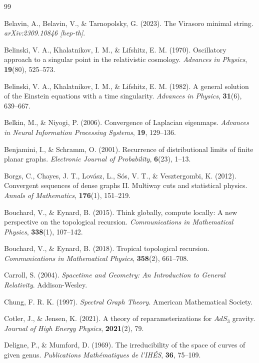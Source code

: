 \documentclass[12pt]{article}
\theoremstyle{definition}
\begin{document}
\begin{thebibliography}{99}

 Belavin, A., Belavin, V., \& Tarnopolsky, G. (2023). The Virasoro minimal string. \textit{arXiv:2309.10846 [hep-th]}.

 Belinski, V. A., Khalatnikov, I. M., \& Lifshitz, E. M. (1970). Oscillatory approach to a singular point in the relativistic cosmology. \textit{Advances in Physics}, \textbf{19}(80), 525--573.

 Belinski, V. A., Khalatnikov, I. M., \& Lifshitz, E. M. (1982). A general solution of the Einstein equations with a time singularity. \textit{Advances in Physics}, \textbf{31}(6), 639--667.

 Belkin, M., \& Niyogi, P. (2006). Convergence of Laplacian eigenmaps. \textit{Advances in Neural Information Processing Systems}, \textbf{19}, 129--136.

 Benjamini, I., \& Schramm, O. (2001). Recurrence of distributional limits of finite planar graphs. \textit{Electronic Journal of Probability}, \textbf{6}(23), 1--13.

 Borgs, C., Chayes, J. T., Lov\'asz, L., S\'os, V. T., \& Vesztergombi, K. (2012). Convergent sequences of dense graphs II. Multiway cuts and statistical physics. \textit{Annals of Mathematics}, \textbf{176}(1), 151--219.

 Bouchard, V., \& Eynard, B. (2015). Think globally, compute locally: A new perspective on the topological recursion. \textit{Communications in Mathematical Physics}, \textbf{338}(1), 107--142.

 Bouchard, V., \& Eynard, B. (2018). Tropical topological recursion. \textit{Communications in Mathematical Physics}, \textbf{358}(2), 661--708.

 Carroll, S. (2004). \textit{Spacetime and Geometry: An Introduction to General Relativity}. Addison-Wesley.

 Chung, F. R. K. (1997). \textit{Spectral Graph Theory}. American Mathematical Society.

 Cotler, J., \& Jensen, K. (2021). A theory of reparameterizations for $AdS_3$ gravity. \textit{Journal of High Energy Physics}, \textbf{2021}(2), 79.

 Deligne, P., \& Mumford, D. (1969). The irreducibility of the space of curves of given genus. \textit{Publications Math\'ematiques de l'IH\'ES}, \textbf{36}, 75--109.


\end{thebibliography}
\end{document}
